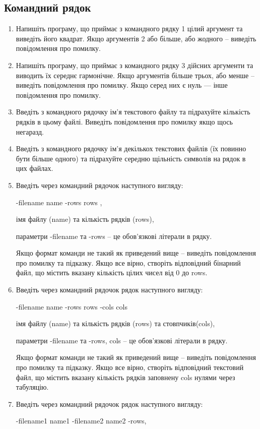 \documentclass[]{article}
\begin{document}
\subsection{Командний рядок}
\begin{enumerate}
\item
Напишіть програму, що приймає з командного рядку 1 цілий аргумент та
виведіть його квадрат. Якщо аргументів 2 або більше, або жодного --
виведіть повідомлення про помилку.
\item
Напишіть програму, що приймає з командного рядку 3 дійсних аргументи та
виводить їх середнє гармонічне. Якщо аргументів більше трьох, або менше
-- виведіть повідомлення про помилку. Якщо серед них є нуль --- інше
повідомлення про помилку.
\item
Введіть з командного рядочку ім'я текстового файлу та підрахуйте
кількість рядків в цьому файлі. Виведіть повідомлення про помилку якщо
щось негаразд.
\item
Введіть з командного рядочку ім'я декількох текстових файлів (їх повинно
бути більше одного) та підрахуйте середню щільність символів на рядок в
цих файлах.
\item
Введіть через командний рядочок наступного вигляду:

-filename name -rows rows ,

імя файлу (name) та кількість рядків (rows),

параметри -filename та -rows -- це обов'язкові літерали в рядку.

Якщо формат команди не такий як приведений вище -- виведіть повідомлення
про помилку та підказку. Якщо все вірно, створіть відповідний бінарний
файл, що містить вказану кількість цілих чисел від 0 до rows.
\item
Введіть через командний рядочок рядок наступного вигляду:

-filename name -rows rows -cols cols

імя файлу (name) та кількість рядків (rows) та стовпчиків(cols),

параметри -filename та -rows, cols -- це обов'язкові літерали в рядку.

Якщо формат команди не такий як приведений вище -- виведіть повідомлення
про помилку та підказку. Якщо все вірно, створіть відповідний текстовий
файл, що містить вказану кількість рядків заповнену cols нулями через
табуляцію.
\item
Введіть через командний рядочок рядок наступного вигляду:

-filename1 name1 -filename2 name2 -rows,


\end{enumerate}
\end{document}
